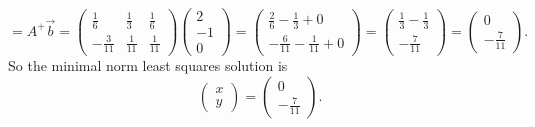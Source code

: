 \documentclass[10pt]{extarticle}
\begin{document}
\begin{enumerate}[label=(\alph*)]
\[=
A^+\vec{b}
=
\begin{pmatrix}
\frac{1}{6} & \frac{1}{3} & \frac{1}{6}\\[0.4em]
-\frac{3}{11} & \frac{1}{11} & \frac{1}{11}
\end{pmatrix}
\begin{pmatrix}
2\\-1\\0
\end{pmatrix}
=
\begin{pmatrix}
\frac{2}{6}-\frac{1}{3}+0\\[0.4em]
-\frac{6}{11}-\frac{1}{11}+0
\end{pmatrix}
=
\begin{pmatrix}
\frac{1}{3}-\frac{1}{3}\\[0.4em]
-\frac{7}{11}
\end{pmatrix}
=
\begin{pmatrix}
0\\[0.4em]
-\frac{7}{11}
\end{pmatrix}.
\]
So the minimal norm least squares solution is
\[
\boxed{\begin{pmatrix}x\\y\end{pmatrix}
=
\begin{pmatrix}
0\\[0.4em]
-\frac{7}{11}
\end{pmatrix}.}
\]
\end{enumerate}
\end{document}
